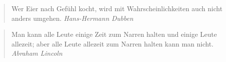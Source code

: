 \documentclass{article}
\begin{document}
		\begin{verse}
		\newline
		\newline
		\newline
		Wer Eier nach Gef\"{u}hl kocht,\newline
		wird mit Wahrscheinlichkeiten auch nicht anders umgehen.\newline
		\small{\itshape Hans-Hermann Dubben}
		\end{verse}
		\newline
		\newline
		
		\begin{verse}
		\newline
		\newline
		\newline
		Man kann alle Leute einige Zeit zum Narren halten\newline
		und einige Leute allezeit;\newline
		aber alle Leute allezeit zum Narren halten kann man nicht.\newline
		\small{\itshape Abraham Lincoln}
		\end{verse}
\newpage
\end{document}
